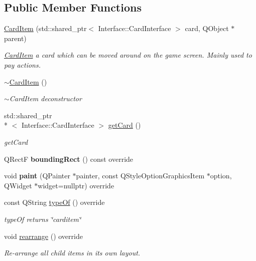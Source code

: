 \subsection*{Public Member Functions}
\begin{DoxyCompactItemize}
\item 
\hyperlink{class_card_item_a51b7eddbca34cef6672dbb03ea75017b}{Card\-Item} (std\-::shared\-\_\-ptr$<$ Interface\-::\-Card\-Interface $>$ card, Q\-Object $\ast$parent)
\begin{DoxyCompactList}\small\item\em \hyperlink{class_card_item}{Card\-Item} a card which can be moved around on the game screen. Mainly used to pay actions. \end{DoxyCompactList}\item 
\hypertarget{class_card_item_a9668ea52f1ded61e4c845d4a42bc3e26}{\hyperlink{class_card_item_a9668ea52f1ded61e4c845d4a42bc3e26}{$\sim$\-Card\-Item} ()}\label{class_card_item_a9668ea52f1ded61e4c845d4a42bc3e26}

\begin{DoxyCompactList}\small\item\em $\sim$\-Card\-Item deconstructor \end{DoxyCompactList}\item 
std\-::shared\-\_\-ptr\\*
$<$ Interface\-::\-Card\-Interface $>$ \hyperlink{class_card_item_a25b9a7fc1a81e13fbe8555e2195d305b}{get\-Card} ()
\begin{DoxyCompactList}\small\item\em get\-Card \end{DoxyCompactList}\item 
\hypertarget{class_card_item_ae6e82cb724cfa2f342ee50326ed92f2c}{Q\-Rect\-F {\bfseries bounding\-Rect} () const override}\label{class_card_item_ae6e82cb724cfa2f342ee50326ed92f2c}

\item 
\hypertarget{class_card_item_a180ebb36fd13715c206ac51ff9ac6248}{void {\bfseries paint} (Q\-Painter $\ast$painter, const Q\-Style\-Option\-Graphics\-Item $\ast$option, Q\-Widget $\ast$widget=nullptr) override}\label{class_card_item_a180ebb36fd13715c206ac51ff9ac6248}

\item 
const Q\-String \hyperlink{class_card_item_a5805490ab3170c1e8cdfa4f96bfa7b35}{type\-Of} () override
\begin{DoxyCompactList}\small\item\em type\-Of returns \char`\"{}carditem\char`\"{} \end{DoxyCompactList}\item 
\hypertarget{class_card_item_a95b36a1aaf30ca2d6d21e69d0c648ff7}{void \hyperlink{class_card_item_a95b36a1aaf30ca2d6d21e69d0c648ff7}{rearrange} () override}\label{class_card_item_a95b36a1aaf30ca2d6d21e69d0c648ff7}

\begin{DoxyCompactList}\small\item\em Re-\/arrange all child items in its own layout. \end{DoxyCompactList}\end{DoxyCompactItemize}
